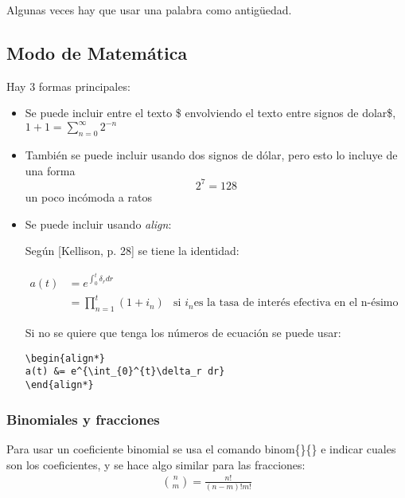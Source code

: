 \documentclass{article}
\begin{document}
Algunas veces hay que usar una palabra como antig\"uedad. 

\subsection{Modo de Matem\'atica}

Hay 3 formas principales:
\begin{itemize}
\item Se puede incluir entre el texto \$ envolviendo el texto  entre signos de dolar\$, $1+1 = \sum_{n=0}^{\infty}2^{-n}$

\item También se puede incluir usando dos signos de d\'olar, pero esto lo incluye de una forma $$2^7 = 128$$ un poco inc\'omoda a ratos

\item Se puede incluir usando \textit{align}:

Seg\'un \cite{Kellison}[Kellison, p. 28] se tiene la identidad:

\begin{align}
	a(t) &= e^{\int_{0}^{t}\delta_r dr} & \\
	&=\prod_{n=1}^{t}(1+i_n) & \text{si } i_n \text{es la tasa de inter\'es efectiva en el n-\'esimo periodo}
\end{align}


Si no se quiere que tenga los n\'umeros de ecuaci\'on se puede usar: 

\begin{verbatim}
\begin{align*}
a(t) &= e^{\int_{0}^{t}\delta_r dr}
\end{align*}
\end{verbatim}

\end{itemize}


\subsubsection{Binomiales y fracciones}
Para usar un coeficiente binomial se usa el comando binom\{\}\{\} e indicar cuales son los coeficientes, y se hace algo similar para las fracciones:
\begin{align*}
\binom{n}{m} = \frac{n!}{(n-m)!m!}
\end{align*}

\newcommand{\mIng}[1]{\int_{#1}^{\infty}}
\newcommand{\mInt}{\mIng{0}}
\end{document}

